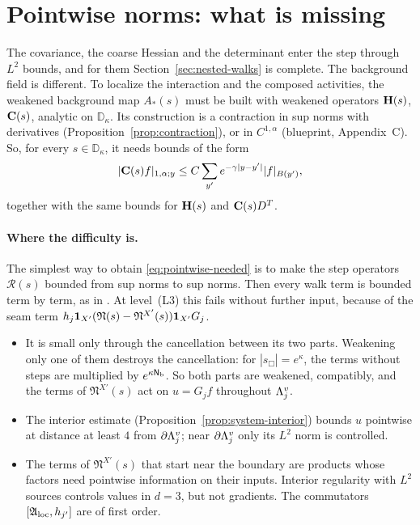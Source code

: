 \section{Pointwise norms: what is missing}\label{sec:pointwise-weak}

The covariance, the coarse Hessian and the determinant enter the step through $L^2$ bounds, and for them Section~\ref{sec:nested-walks} is complete. The background field is different. To localize the interaction and the composed activities, the weakened background map $A_*(s)$ must be built with weakened operators $\mathbf H(s)$, $\mathbf C(s)$, analytic on $\mathbb D_\kappa$. Its construction is a contraction in sup norms with derivatives (Proposition~\ref{prop:contraction}), or in $C^{1,\alpha}$ (blueprint, Appendix~C). So, for every $s\in\mathbb D_\kappa$, it needs bounds of the form
\begin{equation}\label{eq:pointwise-needed}
|\mathbf C(s)f|_{1,\alpha;y}\le C\sum_{y'}e^{-\gamma|y-y'|}|f|_{B(y')},
\end{equation}
together with the same bounds for $\mathbf H(s)$ and $\mathbf C(s)D^T$.

\paragraph{Where the difficulty is.} The simplest way to obtain \eqref{eq:pointwise-needed} is to make the step operators $\mathcal R(s)$ bounded from sup norms to sup norms. Then every walk term is bounded term by term, as in \cite[(97)--(99)]{DimockI}. At level~(L3) this fails without further input, because of the seam term $h_j\mathbf 1_{X'}(\mathfrak N(s)-\mathfrak N^{X'}(s))\mathbf 1_{X'}G_j$.
\begin{itemize}
\item It is small only through the cancellation between its two parts. Weakening only one of them destroys the cancellation: for $|s_\Box|=e^\kappa$, the terms without steps are multiplied by $e^{\kappa\mathsf N_{\rm b}}$. So both parts are weakened, compatibly, and the terms of $\mathfrak N^{X'}(s)$ act on $u=G_jf$ throughout $\Lambda^v_j$.
\item The interior estimate (Proposition~\ref{prop:system-interior}) bounds $u$ pointwise at distance at least $4$ from $\partial\Lambda^v_j$; near $\partial\Lambda^v_j$ only its $L^2$ norm is controlled.
\item The terms of $\mathfrak N^{X'}(s)$ that start near the boundary are products whose factors need pointwise information on their inputs. Interior regularity with $L^2$ sources controls values in $d=3$, but not gradients. The commutators $[\mathfrak A_{\rm loc},h_{j'}]$ are of first order.
\end{itemize}

